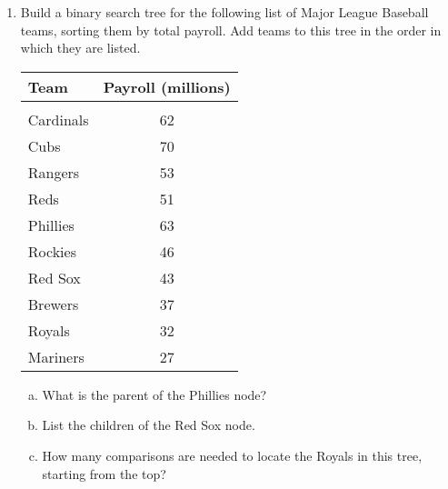 \begin{enumerate}
\item Build a binary search tree for the following list of Major League Baseball teams, sorting them by total payroll.  Add teams to this tree in the order in which they are listed.
\begin{center}
\begin{tabular}{l c}
\textbf{Team} & \textbf{Payroll (millions)}\\
\hline
& \\
Cardinals & 62\\
Cubs & 70\\
Rangers & 53\\
Reds & 51\\
Phillies & 63\\
Rockies & 46\\
Red Sox & 43\\
Brewers & 37\\
Royals & 32\\
Mariners & 27
\end{tabular}
\end{center}
\begin{enumerate}[(a)]
\item What is the parent of the Phillies node? 
\item List the children of the Red Sox node. 
\item How many comparisons are needed to locate the Royals in this tree, starting from the top? 
\end{enumerate}
\end{enumerate}


